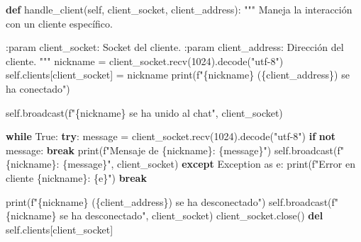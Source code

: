 \documentclass[
  a4paper,
  DIV=11,
  numbers=noendperiod,
  onepage,
  openany]{scrreprt}
\newenvironment{Shaded}{\begin{snugshade}}{\end{snugshade}}
\newcommand{\BuiltInTok}[1]{\textcolor[rgb]{0.00,0.23,0.31}{#1}}
\newcommand{\CommentTok}[1]{\textcolor[rgb]{0.37,0.37,0.37}{#1}}
\newcommand{\ControlFlowTok}[1]{\textcolor[rgb]{0.00,0.23,0.31}{\textbf{#1}}}
\newcommand{\DecValTok}[1]{\textcolor[rgb]{0.68,0.00,0.00}{#1}}
\newcommand{\ImportTok}[1]{\textcolor[rgb]{0.00,0.46,0.62}{#1}}
\newcommand{\KeywordTok}[1]{\textcolor[rgb]{0.00,0.23,0.31}{\textbf{#1}}}
\newcommand{\NormalTok}[1]{\textcolor[rgb]{0.00,0.23,0.31}{#1}}
\newcommand{\OperatorTok}[1]{\textcolor[rgb]{0.37,0.37,0.37}{#1}}
\newcommand{\PreprocessorTok}[1]{\textcolor[rgb]{0.68,0.00,0.00}{#1}}
\newcommand{\SpecialCharTok}[1]{\textcolor[rgb]{0.37,0.37,0.37}{#1}}
\newcommand{\SpecialStringTok}[1]{\textcolor[rgb]{0.13,0.47,0.30}{#1}}
\newcommand{\StringTok}[1]{\textcolor[rgb]{0.13,0.47,0.30}{#1}}
\newcommand{\VariableTok}[1]{\textcolor[rgb]{0.07,0.07,0.07}{#1}}
\begin{document}
\begin{Shaded}
\begin{Highlighting}[]
    \KeywordTok{def}\NormalTok{ handle\_client(}\VariableTok{self}\NormalTok{, client\_socket, client\_address):}
        \CommentTok{"""}
\CommentTok{        Maneja la interacción con un cliente específico.}

\CommentTok{        :param client\_socket: Socket del cliente.}
\CommentTok{        :param client\_address: Dirección del cliente.}
\CommentTok{        """}
\NormalTok{        nickname }\OperatorTok{=}\NormalTok{ client\_socket.recv(}\DecValTok{1024}\NormalTok{).decode(}\StringTok{"utf{-}8"}\NormalTok{)}
        \VariableTok{self}\NormalTok{.clients[client\_socket] }\OperatorTok{=}\NormalTok{ nickname}
        \BuiltInTok{print}\NormalTok{(}\SpecialStringTok{f"}\SpecialCharTok{\{}\NormalTok{nickname}\SpecialCharTok{\}}\SpecialStringTok{ (}\SpecialCharTok{\{}\NormalTok{client\_address}\SpecialCharTok{\}}\SpecialStringTok{) se ha conectado"}\NormalTok{)}

        \VariableTok{self}\NormalTok{.broadcast(}\SpecialStringTok{f"}\SpecialCharTok{\{}\NormalTok{nickname}\SpecialCharTok{\}}\SpecialStringTok{ se ha unido al chat"}\NormalTok{, client\_socket)}

        \ControlFlowTok{while} \VariableTok{True}\NormalTok{:}
            \ControlFlowTok{try}\NormalTok{:}
\NormalTok{                message }\OperatorTok{=}\NormalTok{ client\_socket.recv(}\DecValTok{1024}\NormalTok{).decode(}\StringTok{"utf{-}8"}\NormalTok{)}
                \ControlFlowTok{if} \KeywordTok{not}\NormalTok{ message:}
                    \ControlFlowTok{break}
                \BuiltInTok{print}\NormalTok{(}\SpecialStringTok{f"Mensaje de }\SpecialCharTok{\{}\NormalTok{nickname}\SpecialCharTok{\}}\SpecialStringTok{: }\SpecialCharTok{\{}\NormalTok{message}\SpecialCharTok{\}}\SpecialStringTok{"}\NormalTok{)}
                \VariableTok{self}\NormalTok{.broadcast(}\SpecialStringTok{f"}\SpecialCharTok{\{}\NormalTok{nickname}\SpecialCharTok{\}}\SpecialStringTok{: }\SpecialCharTok{\{}\NormalTok{message}\SpecialCharTok{\}}\SpecialStringTok{"}\NormalTok{, client\_socket)}
            \ControlFlowTok{except} \PreprocessorTok{Exception} \ImportTok{as}\NormalTok{ e:}
                \BuiltInTok{print}\NormalTok{(}\SpecialStringTok{f"Error en cliente }\SpecialCharTok{\{}\NormalTok{nickname}\SpecialCharTok{\}}\SpecialStringTok{: }\SpecialCharTok{\{}\NormalTok{e}\SpecialCharTok{\}}\SpecialStringTok{"}\NormalTok{)}
                \ControlFlowTok{break}

        \BuiltInTok{print}\NormalTok{(}\SpecialStringTok{f"}\SpecialCharTok{\{}\NormalTok{nickname}\SpecialCharTok{\}}\SpecialStringTok{ (}\SpecialCharTok{\{}\NormalTok{client\_address}\SpecialCharTok{\}}\SpecialStringTok{) se ha desconectado"}\NormalTok{)}
        \VariableTok{self}\NormalTok{.broadcast(}\SpecialStringTok{f"}\SpecialCharTok{\{}\NormalTok{nickname}\SpecialCharTok{\}}\SpecialStringTok{ se ha desconectado"}\NormalTok{, client\_socket)}
\NormalTok{        client\_socket.close()}
        \KeywordTok{del} \VariableTok{self}\NormalTok{.clients[client\_socket]}


\end{Highlighting}
\end{Shaded}
\end{document}
